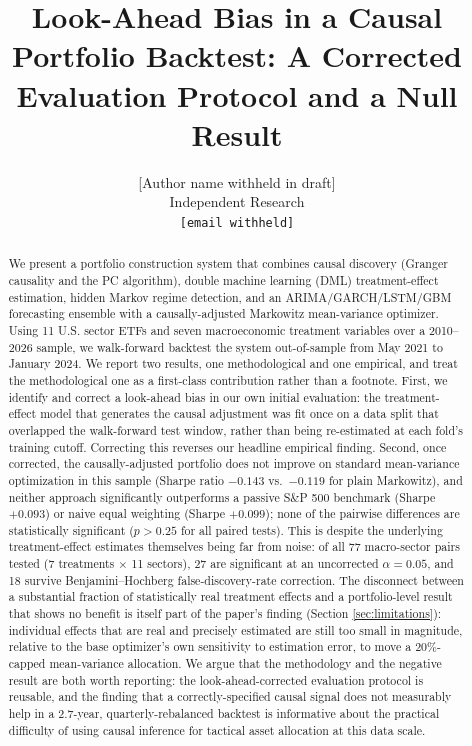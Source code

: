 \documentclass[10pt,twocolumn]{article}
\title{Look-Ahead Bias in a Causal Portfolio Backtest: A Corrected \\ Evaluation Protocol and a Null Result}
\author{
  [Author name withheld in draft] \\
  \small Independent Research \\
  \small \texttt{[email withheld]}
}
\date{}
\begin{document}
\maketitle

\begin{abstract}
We present a portfolio construction system that combines causal discovery
(Granger causality and the PC algorithm), double machine learning (DML)
treatment-effect estimation, hidden Markov regime detection, and an
ARIMA/GARCH/LSTM/GBM forecasting ensemble with a causally-adjusted
Markowitz mean-variance optimizer. Using 11 U.S. sector ETFs and seven
macroeconomic treatment variables over a 2010--2026 sample, we walk-forward
backtest the system out-of-sample from May 2021 to January 2024. We report
two results, one methodological and one empirical, and treat the
methodological one as a first-class contribution rather than a footnote.
First, we identify and correct a look-ahead bias in our own initial
evaluation: the treatment-effect model that generates the causal
adjustment was fit once on a data split that overlapped the walk-forward
test window, rather than being re-estimated at each fold's training
cutoff. Correcting this reverses our headline empirical finding. Second,
once corrected, the causally-adjusted portfolio does not improve on
standard mean-variance optimization in this sample (Sharpe ratio
$-0.143$ vs.\ $-0.119$ for plain Markowitz), and neither approach
significantly outperforms a passive S\&P 500 benchmark (Sharpe $+0.093$)
or naive equal weighting (Sharpe $+0.099$); none of the pairwise
differences are statistically significant ($p > 0.25$ for all paired
tests). This is despite the underlying treatment-effect estimates
themselves being far from noise: of all 77 macro-sector pairs tested (7
treatments $\times$ 11 sectors), 27 are significant at an uncorrected
$\alpha=0.05$, and 18 survive Benjamini--Hochberg false-discovery-rate
correction. The disconnect between a substantial fraction of
statistically real treatment effects and a portfolio-level result that
shows no benefit is itself part of the paper's finding (Section
\ref{sec:limitations}): individual effects that are real and precisely
estimated are still too small in magnitude, relative to the base
optimizer's own sensitivity to estimation error, to move a
20\%-capped mean-variance allocation. We argue that the
methodology and the negative result are both worth reporting: the
look-ahead-corrected evaluation protocol is reusable, and the finding
that a correctly-specified causal signal does not measurably help in a
2.7-year, quarterly-rebalanced backtest is informative about the
practical difficulty of using causal inference for tactical asset
allocation at this data scale.
\end{abstract}
\end{document}
